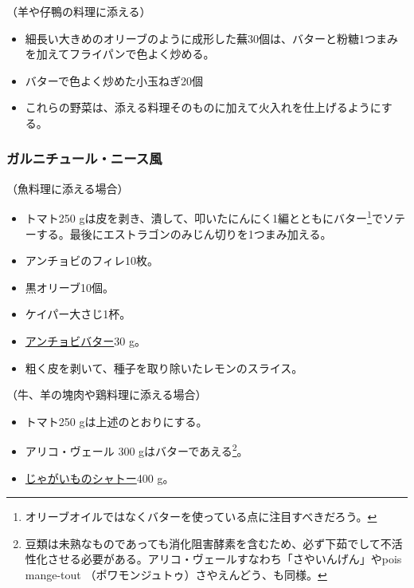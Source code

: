 \begin{recette}
（羊や仔鴨の料理に添える）

\begin{itemize}
\item
  細長い大きめのオリーブのように成形した蕪30個は、バターと粉糖1つまみを加えてフライパンで色よく炒める。
\item
  バターで色よく炒めた小玉ねぎ20個
\item
  これらの野菜は、添える料理そのものに加えて火入れを仕上げるようにする。
\end{itemize}

\hypertarget{garniture-a-la-nicoise}{%
\subsubsection{ガルニチュール・ニース風}\label{garniture-a-la-nicoise}}



（魚料理に添える場合）

\begin{itemize}
\item
  トマト250
  gは皮を剥き、潰して、叩いたにんにく1編とともにバター\footnote{オリーブオイルではなくバターを使っている点に注目すべきだろう。}でソテーする。最後にエストラゴンのみじん切りを1つまみ加える。
\item
  アンチョビのフィレ10枚。
\item
  黒オリーブ10個。
\item
  ケイパー大さじ1杯。
\item
  \protect\hyperlink{beurre-d-anchois}{アンチョビバター}30 g。
\item
  粗く皮を剥いて、種子を取り除いたレモンのスライス。
\end{itemize}

（牛、羊の塊肉や鶏料理に添える場合）

\begin{itemize}
\item
  トマト250 gは上述のとおりにする。
\item
  アリコ・ヴェール 300 gはバターであえる\footnote{豆類は未熟なものであっても消化阻害酵素を含むため、必ず下茹でして不活性化させる必要がある。アリコ・ヴェールすなわち「さやいんげん」やpois
    mange-tout （ポワモンジュトゥ）さやえんどう、も同様。}。
\item
  \protect\hyperlink{pommes-de-terre-chateau}{じゃがいものシャトー}400
  g。
\end{itemize}


\end{recette}
